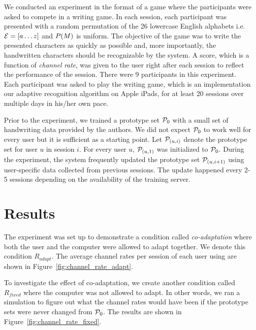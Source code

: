 \documentclass{sigchi}
\begin{document}
We conducted an experiment in the format of a game where the
participants were asked to compete in a writing game. In each session,
each participant was presented with a random permutation of the 26
lowercase English alphabets i.e. $\mathcal{E} = \left[ a \ldots z \right]$
and $P(M)$ is uniform. The objective of the game was to write
the presented characters as quickly as possible and, more importantly,
the handwritten characters should be recognizable by the system. A
score, which is a function of {\it channel rate}, was given to the
user right after each session to reflect the performance of the
session. There were 9 participants in this experiment. Each participant was
asked to play the writing game, which is an implementation our adaptive
recognition algorithm on Apple iPads, for at least
20 sessions over multiple days in his/her own pace. 

Prior to the experiment, we trained a prototype set $\mathcal{P}_0$
with a small set of handwriting data provided by the authors. We did
not expect $\mathcal{P}_0$ to work well for every user but it is
sufficient as a starting point. Let $\mathcal{P}_{(u,i)}$ denote the
prototype set for user $u$ in session $i$. For every user $u$,
$\mathcal{P}_{(u,1)}$ was initialized to $\mathcal{P}_0$. During
the experiment, the system frequently updated the prototype set
$\mathcal{P}_{(u,i+1)}$ using user-specific data collected from
previous sessions. The update happened every 2-5 sessions
depending on the availability of the training server. 


\section{Results}
\label{sec:results}

The experiment was set up to demonstrate a condition called {\em
  co-adaptation} where both the user and the computer were allowed to
adapt together. We denote this condition $R_{adapt}$. The average
channel rates per session of each user using are shown in
Figure~\ref{fig:channel_rate_adapt}. 

To investigate the effect of co-adaptation, we create another
condition called $R_{fixed}$ where the computer was not allowed to
adapt. In other words, we ran a simulation to figure out what the
channel rates would have been if the prototype sets were never changed
from $\mathcal{P}_0$. The results are shown in
Figure~\ref{fig:channel_rate_fixed}.
\end{document}
